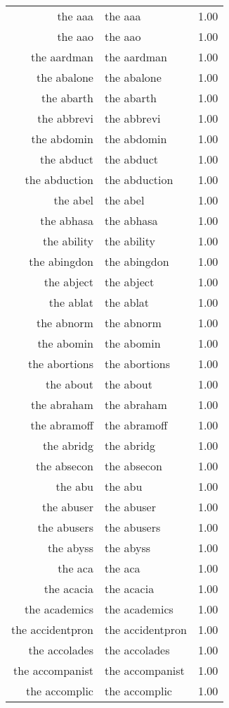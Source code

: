 \begin{table}[ht]
\begin{tabular}{rlr}
  the aaa & the aaa & 1.00 \\ 
  the aao & the aao & 1.00 \\ 
  the aardman & the aardman & 1.00 \\ 
  the abalone & the abalone & 1.00 \\ 
  the abarth & the abarth & 1.00 \\ 
  the abbrevi & the abbrevi & 1.00 \\ 
  the abdomin & the abdomin & 1.00 \\ 
  the abduct & the abduct & 1.00 \\ 
  the abduction & the abduction & 1.00 \\ 
  the abel & the abel & 1.00 \\ 
  the abhasa & the abhasa & 1.00 \\ 
  the ability & the ability & 1.00 \\ 
  the abingdon & the abingdon & 1.00 \\ 
  the abject & the abject & 1.00 \\ 
  the ablat & the ablat & 1.00 \\ 
  the abnorm & the abnorm & 1.00 \\ 
  the abomin & the abomin & 1.00 \\ 
  the abortions & the abortions & 1.00 \\ 
  the about & the about & 1.00 \\ 
  the abraham & the abraham & 1.00 \\ 
  the abramoff & the abramoff & 1.00 \\ 
  the abridg & the abridg & 1.00 \\ 
  the absecon & the absecon & 1.00 \\ 
  the abu & the abu & 1.00 \\ 
  the abuser & the abuser & 1.00 \\ 
  the abusers & the abusers & 1.00 \\ 
  the abyss & the abyss & 1.00 \\ 
  the aca & the aca & 1.00 \\ 
  the acacia & the acacia & 1.00 \\ 
  the academics & the academics & 1.00 \\ 
  the accidentpron & the accidentpron & 1.00 \\ 
  the accolades & the accolades & 1.00 \\ 
  the accompanist & the accompanist & 1.00 \\ 
  the accomplic & the accomplic & 1.00 \\ 

\end{tabular}
\end{table}
